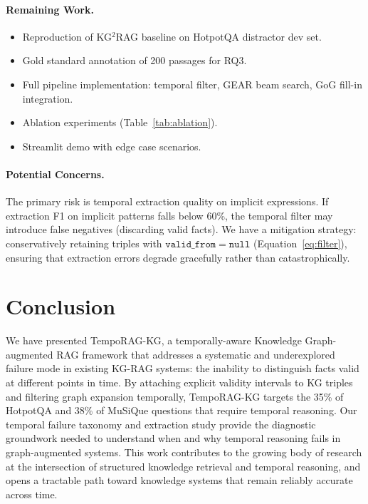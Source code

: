 \documentclass[11pt]{article}
\begin{document}
\paragraph{Remaining Work.}
\begin{itemize}
  \item Reproduction of KG$^2$RAG baseline on HotpotQA distractor dev set.
  \item Gold standard annotation of 200 passages for RQ3.
  \item Full pipeline implementation: temporal filter, GEAR beam search,
    GoG fill-in integration.
  \item Ablation experiments (Table~\ref{tab:ablation}).
  \item Streamlit demo with edge case scenarios.
\end{itemize}

\paragraph{Potential Concerns.}
The primary risk is temporal extraction quality on implicit expressions.
If extraction F1 on implicit patterns falls below 60\%, the temporal
filter may introduce false negatives (discarding valid facts). We have
a mitigation strategy: conservatively retaining triples with
$\mathtt{valid\_from} = \mathtt{null}$ (Equation~\ref{eq:filter}),
ensuring that extraction errors degrade gracefully rather than
catastrophically.

\section{Conclusion}

We have presented TempoRAG-KG, a temporally-aware Knowledge Graph-augmented
RAG framework that addresses a systematic and underexplored failure mode in
existing KG-RAG systems: the inability to distinguish facts valid at
different points in time. By attaching explicit validity intervals to KG
triples and filtering graph expansion temporally, TempoRAG-KG targets the
35\% of HotpotQA and 38\% of MuSiQue questions that require temporal
reasoning. Our temporal failure taxonomy and extraction study provide
the diagnostic groundwork needed to understand when and why temporal
reasoning fails in graph-augmented systems. This work contributes to the
growing body of research at the intersection of structured knowledge
retrieval and temporal reasoning, and opens a tractable path toward
knowledge systems that remain reliably accurate across time.
\end{document}
